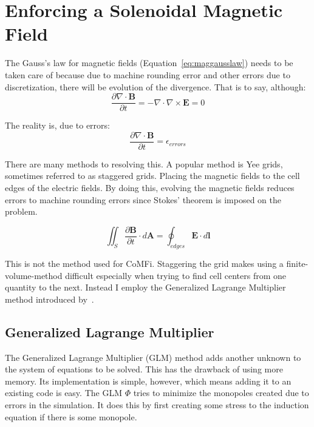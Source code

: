 \documentclass[12pt,upcase]{umlthesis}
\begin{document}
\section{Enforcing a Solenoidal Magnetic Field}\label{sec:divergencefree}

The Gauss's law for magnetic fields (Equation~\ref{eq:maggausslaw}) needs to be taken care of because due to machine rounding error and other errors due to discretization, there will be evolution of the divergence. That is to say, although:
\begin{equation}
	\frac{\partial\nabla\cdot\textbf{B}}{\partial t} = -\nabla\cdot\nabla\times\textbf{E} = 0
\end{equation}

The reality is, due to errors:
\begin{equation}
	\frac{\partial\nabla\cdot\textbf{B}}{\partial t} = \epsilon_{errors}
\end{equation}

There are many methods to resolving this. A popular method is Yee grids, sometimes referred to as staggered grids. Placing the magnetic fields to the cell edges of the electric fields. By doing this, evolving the magnetic fields reduces errors to machine rounding errors since Stokes' theorem is imposed on the problem.

\begin{equation}\label{eq:stokesyee}
	\iint_S\frac{\partial\textbf{B}}{\partial t}\cdot d\textbf{A} = {\oint}_{edges} \textbf{E}\cdot d\textbf{l}
\end{equation}

This is not the method used for CoMFi. Staggering the grid makes using a finite-volume-method difficult especially when trying to find cell centers from one quantity to the next. Instead I employ the Generalized Lagrange Multiplier method introduced by~\citet{glm}.

\subsection{Generalized Lagrange Multiplier}

The Generalized Lagrange Multiplier (GLM) method adds another unknown to the system of equations to be solved. This has the drawback of using more memory. Its implementation is simple, however, which means adding it to an existing code is easy. The GLM $\Phi$ tries to minimize the monopoles created due to errors in the simulation. It does this by first creating some stress to the induction equation if there is some monopole.
\end{document}
